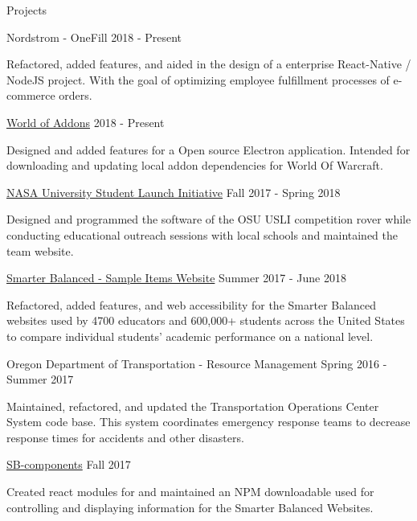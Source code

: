 \documentclass{resume} %
\begin{document}
\begin{rSection}{Projects}
  \begin{rSubsection} {Nordstrom - OneFill} {2018 - Present} {} {}
  \item Refactored, added features, and aided in the design of a enterprise React-Native / NodeJS project. With the goal of optimizing employee fulfillment processes of e-commerce orders.
  \end{rSubsection}

  \begin{rSubsection} {\href{https://github.com/WorldofAddons/worldofaddons}{World of Addons}} {2018 - Present} {} {}
  \item Designed and added features for a Open source Electron application. Intended for downloading and updating local addon dependencies for World Of Warcraft.
  \end{rSubsection}
  
  \begin{rSubsection} {\href{http://osu-usli.com}{NASA University Student Launch Initiative}} {Fall 2017 - Spring 2018} {} {}
  \item Designed and programmed the software of the OSU USLI competition rover while conducting educational outreach sessions with local schools and maintained the team website.
  \end{rSubsection}

  \begin{rSubsection} {\href{http://sampleitems.smarterbalanced.org}{Smarter Balanced - Sample Items Website}} {Summer 2017 - June 2018} {} {}
  \item Refactored, added features, and web accessibility for the Smarter Balanced websites used by 4700 educators and 600,000+ students across the United States to compare individual students' academic performance on a national level.
  \end{rSubsection}

  \begin{rSubsection} {Oregon Department of Transportation - Resource Management} {Spring 2016 - Summer 2017} {} {}
  \item Maintained, refactored, and updated the Transportation Operations Center System code base. This system coordinates emergency response teams to decrease response times for accidents and other disasters.
  \end{rSubsection}

  \begin{rSubsection} {\href{https://www.npmjs.com/package/@osu-cass/sb-components}{SB-components}} {Fall 2017} {} {}
  \item Created react modules for and maintained an NPM downloadable used for controlling and displaying information for the Smarter Balanced Websites.
  \end{rSubsection}

\end{rSection}
\end{document}
